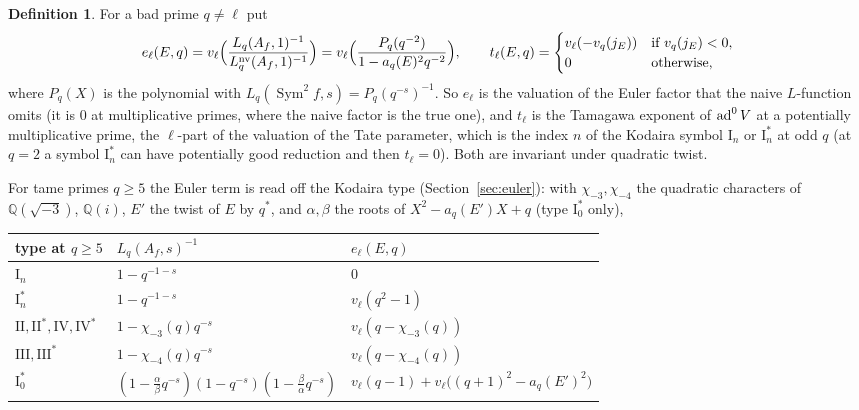 \documentclass[11pt]{amsart}
\theoremstyle{definition}
\newtheorem{definition}[theorem]{Definition}
\newcommand{\Q}{\mathbb{Q}}\newcommand{\Z}{\mathbb{Z}}\newcommand{\F}{\mathbb{F}}
\newcommand{\Sym}{\operatorname{Sym}^2}\newcommand{\nv}{\mathrm{nv}}\newcommand{\T}{\mathbb{T}}\newcommand{\Ns}{3\mathrm{Ns}}
\begin{document}
\begin{definition}\label{def:terms}
For a bad prime $q\ne\ell$ put
\[
e_\ell(E,q)=v_\ell\Bigl(\frac{L_q(A_f,1)^{-1}}{L_q^{\nv}(A_f,1)^{-1}}\Bigr)=v_\ell\Bigl(\frac{P_q(q^{-2})}{1-a_q(E)^2q^{-2}}\Bigr),\qquad t_\ell(E,q)=\begin{cases}v_\ell(-v_q(j_E))&\text{if }v_q(j_E)<0,\\0&\text{otherwise,}\end{cases}
\]
where $P_q(X)$ is the polynomial with $L_q(\Sym f,s)=P_q(q^{-s})^{-1}$. So $e_\ell$ is the valuation of the Euler factor that the naive $L$-function omits (it is $0$ at multiplicative primes, where the naive factor is the true one), and $t_\ell$ is the Tamagawa exponent of $\operatorname{ad}^0 V$ at a potentially multiplicative prime, the $\ell$-part of the valuation of the Tate parameter, which is the index $n$ of the Kodaira symbol $\mathrm{I}_n$ or $\mathrm{I}_n^*$ at odd $q$ (at $q=2$ a symbol $\mathrm{I}_n^*$ can have potentially good reduction and then $t_\ell=0$). Both are invariant under quadratic twist.
\end{definition}

For tame primes $q\ge5$ the Euler term is read off the Kodaira type (Section~\ref{sec:euler}): with $\chi_{-3},\chi_{-4}$ the quadratic characters of $\Q(\sqrt{-3})$, $\Q(i)$, $E'$ the twist of $E$ by $q^*$, and $\alpha,\beta$ the roots of $X^2-a_q(E')X+q$ (type $\mathrm{I}_0^*$ only),
\begin{center}\footnotesize
\begin{tabular}{lll}
\toprule
type at $q\ge5$ & $L_q(A_f,s)^{-1}$ & $e_\ell(E,q)$\\
\midrule
$\mathrm{I}_n$ & $1-q^{-1-s}$ & $0$\\
$\mathrm{I}_n^*$ & $1-q^{-1-s}$ & $v_\ell(q^2-1)$\\
$\mathrm{II},\mathrm{II}^*,\mathrm{IV},\mathrm{IV}^*$ & $1-\chi_{-3}(q)q^{-s}$ & $v_\ell(q-\chi_{-3}(q))$\\
$\mathrm{III},\mathrm{III}^*$ & $1-\chi_{-4}(q)q^{-s}$ & $v_\ell(q-\chi_{-4}(q))$\\
$\mathrm{I}_0^*$ & $(1-\tfrac{\alpha}{\beta}q^{-s})(1-q^{-s})(1-\tfrac{\beta}{\alpha}q^{-s})$ & $v_\ell(q-1)+v_\ell\bigl((q+1)^2-a_q(E')^2\bigr)$\\
\bottomrule
\end{tabular}
\end{center}
\end{document}
